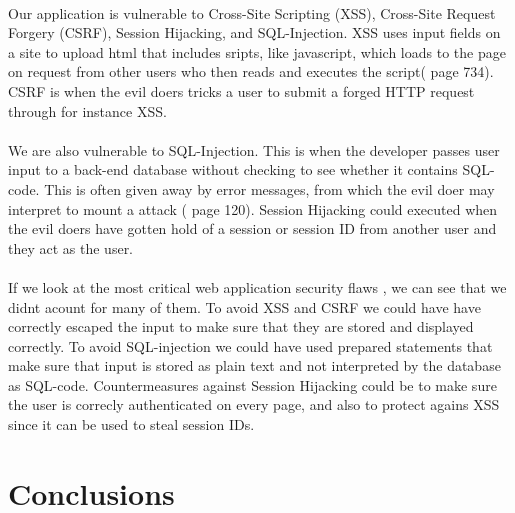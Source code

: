 \documentclass[a4paper,11pt]{article}
\begin{document}
\paragraph{}Our application is vulnerable to Cross-Site Scripting (XSS), Cross-Site Request Forgery (CSRF), Session Hijacking, and SQL-Injection. XSS uses input fields on a site to upload html that includes sripts, like javascript, which loads to the page on request from other users who then reads and executes the script(\cite{8} page 734). CSRF is when the evil doers tricks a user to submit a forged HTTP request through for instance XSS.
\paragraph{}We are also vulnerable to SQL-Injection. This is when the developer passes user input to a back-end database without checking to see whether it contains SQL-code. This is often given away by error messages, from which the evil doer may interpret to mount a attack (\cite{8} page 120). Session Hijacking could executed when the evil doers have gotten hold of a session or session ID from another user and they act as the user.
\paragraph{}If we look at the most critical web application security flaws \cite{7}, we can see that we didnt acount for many of them. To avoid XSS and CSRF we could have have correctly escaped the input to make sure that they are stored and displayed correctly. To avoid SQL-injection we could have used prepared statements that make sure that input is stored as plain text and not interpreted by the database as SQL-code. Countermeasures against Session Hijacking could be to make sure the user is correcly authenticated on every page, and also to protect agains XSS since it can be used to steal session IDs.
\section{Conclusions}
\end{document}
